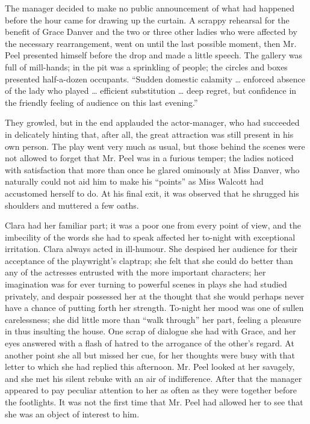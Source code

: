 The manager decided to make no public announcement of what had happened
before the hour came for drawing up the curtain.
{\protect\hypertarget{203}{}{}}A scrappy rehearsal for the benefit of
Grace Danver and the two or three other ladies who were affected by the
necessary rearrangement, went on until the last possible moment, then
Mr. Peel presented himself before the drop and made a little speech. The
gallery was full of mill-hands; in the pit was a sprinkling of people;
the circles and boxes presented half-a-dozen occupants. ``Sudden
domestic calamity \ldots{} enforced absence of the lady who played
\ldots{} efficient substitution \ldots{} deep regret, but confidence in
the friendly feeling of audience on this last evening.''

They growled, but in the end applauded the actor-manager, who had
succeeded in delicately hinting that, after all, the great attraction
was still present in his own person. The play went very much as usual,
but those behind the scenes were not allowed to forget that Mr. Peel was
in a furious temper; the ladies noticed with satisfaction that more than
once he glared ominously at Miss Danver, who naturally could not aid him
to make his ``points'' as Miss Walcott had accustomed
{\protect\hypertarget{204}{}{}}herself to do. At his final exit, it was
observed that he shrugged his shoulders and muttered a few oaths.

Clara had her familiar part; it was a poor one from every point of view,
and the imbecility of the words she had to speak affected her to-night
with exceptional irritation. Clara always acted in ill-humour. She
despised her audience for their acceptance of the playwright's claptrap;
she felt that she could do better than any of the actresses entrusted
with the more important characters; her imagination was for ever turning
to powerful scenes in plays she had studied privately, and despair
possessed her at the thought that she would perhaps never have a chance
of putting forth her strength. To-night her mood was one of sullen
carelessness; she did little more than ``walk through'' her part,
feeling a pleasure in thus insulting the house. One scrap of dialogue
she had with Grace, and her eyes answered with a flash of hatred to the
arrogance of the other's regard. At another point she all but missed her
cue, for her thoughts {\protect\hypertarget{205}{}{}}were busy with that
letter to which she had replied this afternoon. Mr. Peel looked at her
savagely, and she met his silent rebuke with an air of indifference.
After that the manager appeared to pay peculiar attention to her as
often as they were together before the footlights. It was not the first
time that Mr. Peel had allowed her to see that she was an object of
interest to him.

